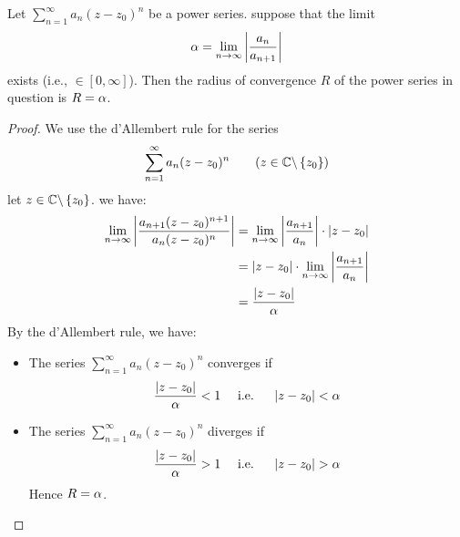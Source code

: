 \begin{proposition}
  Let $\sum_{n=1}^{\infty} a_n (z-z_0) ^n  $ be a power series. suppose that the limit 
  \[
  \alpha = \lim_{n \to \infty}
  \left| 
  \frac{a_n }{a_{n+1}}
  \right|
  \]
  exists (i.e., $\in  [0, \infty ]$). Then the radius of convergence $R $ of the power series in question is 
  $R = \alpha$. 
\end{proposition}
\begin{proof}
We use the d'Allembert rule for the series 
\[
\sum_{n=1}^{\infty} a_n (z-z_0) ^n \quad \quad   (z \in  \mathbb{C} \backslash \left\{ z_0 \right\})  
\]
let $z \in \mathbb{C} \backslash \left\{ z_0 \right\} $. we have: 
\begin{align*}
  \lim_{n \to \infty} \left| \frac{a_{n+1}(z-z_0) ^{n+1}}{a_n (z-z_0) ^n } \right| 
  &=
  \lim_{n \to \infty} \left| \frac{a_{n+1}}{a_n } \right| \cdot 
  \left| z-z_0 \right| \\
  &= 
  \left| z-z_0 \right|\cdot \lim_{n \to \infty} \left| \frac{a_{n+1}}{a_n } \right| \\
  &= \frac{\left| z-z_0 \right|}{\alpha}
\end{align*}
By the d'Allembert rule, we have: 
\begin{itemize}
  \item The series $\sum_{n=1}^{\infty} a_n (z-z_0) ^n  $ 
    converges if 
    \[
    \frac{\left| z-z_0 \right|}{\alpha}< 1 \quad  \text{ i.e. } 
    \quad 
    \left| z-z_0 \right|< \alpha
    \]
    \item 
      The series $\sum_{n=1}^{\infty} a_n (z-z_0) ^n $ 
      diverges if 
      \[
      \frac{\left| z-z_0 \right|}{\alpha} > 1 
      \quad 
      \text{ i.e. } \quad   \left| z-z_0 \right| > \alpha
      \]
      Hence $R = \alpha$. 
\end{itemize}
\end{proof}
